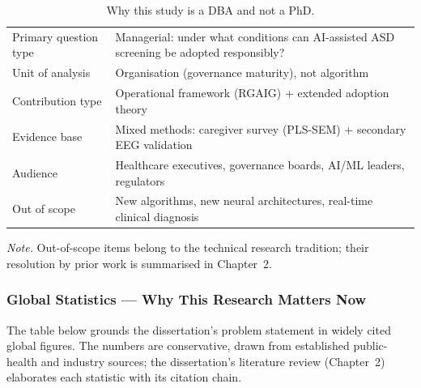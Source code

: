 {\tablestripes\tablefontsize
{}
\begin{xltabular}{\textwidth}{@{} >{\raggedright\arraybackslash}p{5cm} L @{}}
\caption[Why this study is a DBA and not a PhD]{Why this study is a DBA and not a PhD.}\label{tab:ch1_why_dba_compliance} \\
\toprule
{} &  \\
\midrule
\endfirsthead
\endhead
\bottomrule
\endlastfoot
Primary question type & Managerial: under what conditions can AI-assisted ASD screening be adopted responsibly? \\
\addlinespace
Unit of analysis & Organisation (governance maturity), not algorithm \\
\addlinespace
Contribution type & Operational framework (RGAIG) + extended adoption theory \\
\addlinespace
Evidence base & Mixed methods: caregiver survey (PLS-SEM) + secondary EEG validation \\
\addlinespace
Audience & Healthcare executives, governance boards, AI/ML leaders, regulators \\
\addlinespace
Out of scope & New algorithms, new neural architectures, real-time clinical diagnosis \\
\end{xltabular}}

\vspace{0.3em}\noindent\textit{Note.} Out-of-scope items belong to the technical research tradition; their resolution by prior work is summarised in Chapter~2.



\subsubsection{Global Statistics --- Why This Research Matters Now}
\label{sec:ch1_global_statistics}

\noindent The table below grounds the dissertation's problem statement in widely cited global figures. The numbers are conservative, drawn from established public-health and industry sources; the dissertation's literature review (Chapter~2) elaborates each statistic with its citation chain.

